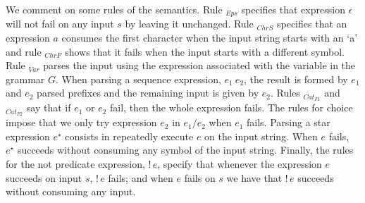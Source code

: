 We comment on some rules of the semantics. Rule \(_{Eps}\) specifies that
expression \(\epsilon\) will not fail on any input \(s\) by leaving it unchanged.
Rule \(_{ChrS}\) specifies that an expression \(a\) consumes the first character when
the input string starts with an `a' and rule \(_{ChrF}\) shows that it fails when
the input starts with a different symbol. Rule \(_{Var}\) parses the input using
the expression associated with the variable in the grammar \(G\). When parsing a
sequence expression, \(e_1\:e_2\), the result is formed by \(e_1\) and \(e_2\) parsed
prefixes and the remaining input is given by \(e_2\). Rules \(_{Cat_{F1}}\) and
\(_{Cat_{F2}}\) say that if \(e_1\) or \(e_2\) fail, then the whole expression fails.
The rules for choice impose that we only try
expression \(e_2\) in \(e_1 / e_2\) when \(e_1\) fails. Parsing a star
expression \(e^\star\) consists in repeatedly execute \(e\) on the input string.
When \(e\) fails, \(e^\star\) succeeds without consuming any symbol of the input
string. Finally, the rules for the not predicate expression, \(!\,e\), specify
that whenever the expression \(e\) succeeds on input \(s\), \(!\,e\) fails; and when \(e\)
fails on \(s\) we have that \(!\,e\) succeeds without consuming any input.

